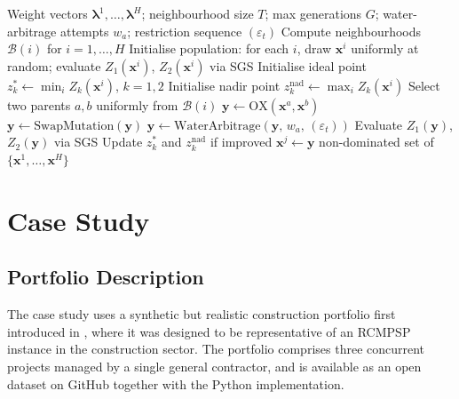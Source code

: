 \documentclass[12pt,a4paper]{article}
\newcommand{\Z}[1]{Z_{#1}}
\newcommand{\eps}{\varepsilon}
\newcommand{\bx}{\mathbf{x}}
\newcommand{\blam}{\boldsymbol{\lambda}}
\newcommand{\zstar}{\mathbf{z}^*}
\begin{document}
\begin{algorithm}[H]
\caption{MOEA/D with Water-Arbitrage for Bi-Objective RCMPSP}
\label{alg:moead}
\begin{algorithmic}[1]
\Require Weight vectors $\blam^1,\ldots,\blam^H$; neighbourhood size $T$;
         max generations $G$; water-arbitrage attempts $w_a$;
         restriction sequence $(\eps_t)$
\State Compute neighbourhoods $\mathcal{B}(i)$ for $i=1,\ldots,H$
\State Initialise population: for each $i$, draw $\bx^i$ uniformly at random;
       evaluate $\Z{1}(\bx^i)$, $\Z{2}(\bx^i)$ via SGS
\State Initialise ideal point $z_k^* \leftarrow \min_i Z_k(\bx^i)$, $k=1,2$
\State Initialise nadir point $z_k^{\mathrm{nad}} \leftarrow \max_i Z_k(\bx^i)$
    \State Select two parents $a,b$ uniformly from $\mathcal{B}(i)$
    \State $\mathbf{y} \leftarrow \mathrm{OX}(\bx^a, \bx^b)$
    \State $\mathbf{y} \leftarrow \mathrm{SwapMutation}(\mathbf{y})$
    \State $\mathbf{y} \leftarrow \mathrm{WaterArbitrage}(\mathbf{y},\, w_a,\, (\eps_t))$
    \State Evaluate $\Z{1}(\mathbf{y})$, $\Z{2}(\mathbf{y})$ via SGS
    \State Update $z_k^*$ and $z_k^{\mathrm{nad}}$ if improved
      \If{$g^{\mathrm{te}}(\mathbf{y} \mid \blam^j, \zstar) <
          g^{\mathrm{te}}(\bx^j \mid \blam^j, \zstar)$}
        \State $\bx^j \leftarrow \mathbf{y}$
      \EndIf
    \EndFor
  \EndFor
\EndFor
\State \Return non-dominated set of $\{\bx^1,\ldots,\bx^H\}$
\end{algorithmic}
\end{algorithm}

\section{Case Study}
\label{sec:case}

\subsection{Portfolio Description}
\label{sec:case:portfolio}

The case study uses a synthetic but realistic construction portfolio first introduced
in \citet{Lostumbo2025}, where it was designed to be representative of an
RCMPSP instance in the construction sector.  The portfolio comprises three concurrent
projects managed by a single general contractor, and is available as an open dataset
on GitHub together with the Python implementation.
\end{document}
